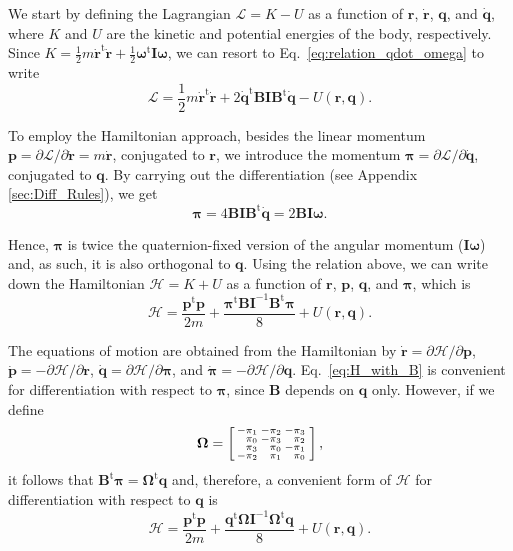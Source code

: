 \documentclass[aip,jcp,reprint,amsmath,amssymb]{revtex4-1}
\makeatletter
\newcommand{\mt}[1]{\boldsymbol{\mathbf{#1}}}           %
\newcommand{\vt}[1]{\boldsymbol{\mathbf{#1}}}           %
\newcommand{\tr}[1]{#1^\text{t}}                        %
\newenvironment{smallarray}[1]                          %
{\null\,\vcenter\bgroup\scriptsize
	\renewcommand{\arraystretch}{0.7}
	\arraycolsep=.13885em
	\hbox\bgroup$\array{@{}#1@{}}}
{\endarray$\egroup\egroup\,\null}
\makeatother
\begin{document}
We start by defining the Lagrangian $\mathcal{L} = K - U$ as a function of $\vt r$, $\dot{\vt r}$, $\vt q$, and $\dot{\vt q}$, where $K$ and $U$ are the kinetic and potential energies of the body, respectively. Since $K = \frac{1}{2} m \tr{\dot{\vt r}} \dot{\vt r} + \frac{1}{2} \tr{\vt \omega} \mt I \vt \omega$,\cite{Goldstein2002} we can resort to Eq.~\ref{eq:relation_qdot_omega} to write
\[
\mathcal{L} = \frac{1}{2} m \tr{\dot{\vt r}} \dot{\vt r} + 2 \tr{\dot{\vt q}} \mt B \mt I \tr{\mt B} \dot{\vt q} - U(\vt r, \vt q).
\]

To employ the Hamiltonian approach, besides the linear momentum $\vt p = \partial \mathcal{L}/\partial \dot{\vt r} = m \dot{\vt r}$, conjugated to $\vt r$, we introduce the momentum $\vt \pi = \partial \mathcal{L}/\partial \dot{\vt q}$, conjugated to $\vt q$.\cite{Goldstein2002} By carrying out the differentiation (see Appendix \ref{sec:Diff_Rules}), we get
\begin{equation}
\label{eq:conj_momentum}
\vt \pi = 4 \mt B \mt I \tr{\mt B} \dot{\vt q} = 2 \mt B \mt I \vt \omega.
\end{equation}

Hence, $\vt \pi$ is twice the quaternion-fixed version of the angular momentum ($\mt I \vt \omega$) and, as such, it is also orthogonal to $\vt q$. Using the relation above, we can write down the Hamiltonian $\mathcal{H} = K + U$ as a function of $\vt r$, $\vt p$, $\vt q$, and $\vt \pi$, which is
\begin{equation}
\label{eq:H_with_B}
\mathcal{H} = \frac{\tr{\vt p} \vt p}{2m} + \frac{\tr{\vt \pi} {\mt B} {\mt I}^{-1} \tr{\mt B} \vt \pi}{8} + U(\vt r, \vt q).
\end{equation}

The equations of motion are obtained from the Hamiltonian by $\dot{\vt r} = \partial \mathcal{H} / \partial \vt p$, $\dot{\vt p} = -\partial \mathcal{H} / \partial \vt r$, $\dot{\vt q} = \partial \mathcal{H} / \partial \vt \pi$, and $\dot{\vt \pi} = -\partial \mathcal{H} / \partial \vt q$.\cite{Goldstein2002} Eq.~\ref{eq:H_with_B} is convenient for differentiation with respect to $\vt \pi$, since $\mt B$ depends on $\vt q$ only. However, if we define
\[
\mt \Omega = \left[
\begin{smallarray}{rrrr}
-\pi_1 & -\pi_2 & -\pi_3 \\
 \pi_0 & -\pi_3 &  \pi_2 \\
 \pi_3 &  \pi_0 & -\pi_1 \\
-\pi_2 &  \pi_1 &  \pi_0
\end{smallarray}
\right],
\]
it follows that $\tr{\mt B}{\vt \pi} = \tr{\mt \Omega}{\vt q}$ and, therefore, a convenient form of $\mathcal{H}$ for differentiation with respect to $\vt q$ is
\begin{equation}
\label{eq:H_with_Omega}
\mathcal{H} = \frac{\tr{\vt p} \vt p}{2m} + \frac{\tr{\vt q} {\mt \Omega} {\mt I}^{-1} \tr{\mt \Omega} \vt q}{8} + U(\vt r, \vt q).
\end{equation}
\end{document}
